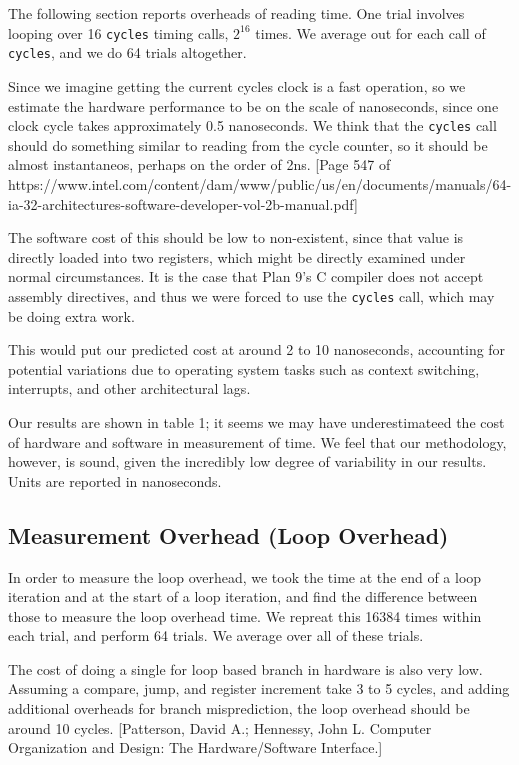 \documentclass[letterpaper,twocolumn,10pt]{article}
\begin{document}
The following section reports overheads of reading time. One trial involves looping over 16 \texttt{cycles} timing calls, $2^{16}$ times. We average out for each call of \texttt{cycles}, and we do 64 trials altogether.

Since we imagine getting the current cycles clock is a fast operation, so we
estimate the hardware performance to be on the scale of nanoseconds, since one
clock cycle takes approximately 0.5 nanoseconds. We think that the
\texttt{cycles} call should do something similar to reading from the cycle
counter, so it should be almost instantaneos, perhaps on the order of 2ns.
[Page 547 of https://www.intel.com/content/dam/www/public/us/en/documents/manuals/64-ia-32-architectures-software-developer-vol-2b-manual.pdf]

The software cost of this should be low to non-existent, since that value is 
directly loaded into two registers, which might be directly examined under normal 
circumstances. It is the case that Plan 9's C compiler does not accept assembly directives, 
and thus we were forced to use the \texttt{cycles} call, which may be doing extra work.

This would put our predicted cost at around 2 to 10 nanoseconds, accounting for potential
variations due to operating system tasks such as context switching, interrupts, and 
other architectural lags.

Our results are shown in table 1; it seems we may have underestimateed the cost of hardware 
and software in measurement of time. We feel that our methodology, however, is sound, given the
incredibly low degree of variability in our results. Units are reported in nanoseconds.

\subsection{Measurement Overhead (Loop Overhead)}

In order to measure the loop overhead, we took the time at the end of a loop
iteration and at the start of a loop iteration, and find the difference between
those to measure the loop overhead time. We repreat this 16384 times within
each trial, and perform 64 trials. We average over all of these trials.

The cost of doing a single for loop based branch in hardware is also very low.
Assuming a compare, jump, and register increment take 3 to 5 cycles, and adding
additional overheads for branch misprediction, the loop overhead should be around
10 cycles. 
[Patterson, David A.; Hennessy, John L. Computer Organization and Design: The Hardware/Software Interface.]
\end{document}
